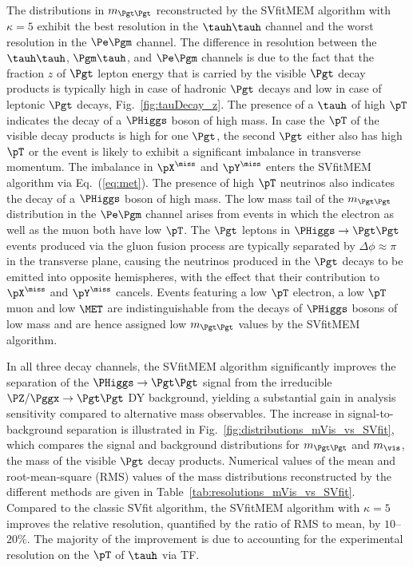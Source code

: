 The distributions in $m_{\Pgt\Pgt}$ reconstructed by the
SVfitMEM algorithm with $\kappa = 5$ exhibit the best
resolution in the $\tauh\tauh$ channel and the worst resolution in the $\Pe\Pgm$ channel.
The difference in resolution between the $\tauh\tauh$, $\Pgm\tauh$,
and $\Pe\Pgm$ channels
is due to the fact that the fraction $z$ of
$\Pgt$ lepton energy that is carried by the visible $\Pgt$ decay
products is typically high in case of hadronic $\Pgt$ decays
and low in case of leptonic $\Pgt$ decays, \cf Fig.~\ref{fig:tauDecay_z}.
The presence of a $\tauh$ of high $\pT$ indicates the decay of a
$\PHiggs$ boson of high mass.
In case the $\pT$ of the visible decay products is high
for one $\Pgt$, the second $\Pgt$ either also has high $\pT$ or the
event is likely to exhibit a significant
imbalance in transverse momentum.
The imbalance in $\pX^{\miss}$ and $\pY^{\miss}$ enters the
SVfitMEM algorithm via Eq.~(\ref{eq:met}).
The presence of high $\pT$ neutrinos also indicates the decay of a $\PHiggs$ boson of high mass.
The low mass tail of the $m_{\Pgt\Pgt}$ distribution in the $\Pe\Pgm$
channel arises from events in which the electron as well as the muon
both have low $\pT$.
The $\Pgt$ leptons in $\PHiggs \to \Pgt\Pgt$ events produced via the
gluon fusion process are typically separated by $\Delta\phi \approx
\pi$ in the transverse plane,
causing the neutrinos produced in the $\Pgt$ decays to be emitted into
opposite hemispheres, with the effect that their contribution to $\pX^{\miss}$ and $\pY^{\miss}$ cancels.
Events featuring a low $\pT$ electron, a low $\pT$ muon and low $\MET$
are indistinguishable from the decays of $\PHiggs$ bosons of low mass
and are hence assigned low $m_{\Pgt\Pgt}$ values by the SVfitMEM algorithm.

In all three decay channels, the SVfitMEM algorithm significantly improves the separation of the $\PHiggs \to \Pgt\Pgt$ signal 
from the irreducible $\PZ/\Pggx \to \Pgt\Pgt$ DY background, yielding a substantial gain in analysis sensitivity
compared to alternative mass observables.
The increase in signal-to-background separation is illustrated in
Fig.~\ref{fig:distributions_mVis_vs_SVfit},
which compares the signal and background distributions for $m_{\Pgt\Pgt}$ and $m_{\vis}$,
the mass of the visible $\Pgt$ decay products.
Numerical values of the mean and root-mean-square (RMS) values
of the mass distributions reconstructed by the different methods are given in
Table~\ref{tab:resolutions_mVis_vs_SVfit}.
Compared to the classic SVfit algorithm, the SVfitMEM algorithm with $\kappa = 5$ improves the relative resolution,
quantified by the ratio of RMS to mean, by $10$--$20\%$.
The majority of the improvement is due to accounting for the experimental resolution on the $\pT$ of $\tauh$ via TF.

